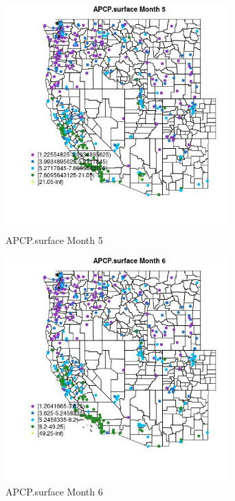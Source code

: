 \begin{figure} 
\centering  
\includegraphics[width=0.77\textwidth]{Code_Outputs/ML_input_report_ML_input_PM25_Step5_part_d_de_duplicated_aves_ML_input_MapObsMo5APCPsurface.jpg} 
\caption{\label{fig:ML_input_report_ML_input_PM25_Step5_part_d_de_duplicated_aves_ML_inputMapObsMo5APCPsurface}APCP.surface Month 5} 
\end{figure} 
 

\begin{figure} 
\centering  
\includegraphics[width=0.77\textwidth]{Code_Outputs/ML_input_report_ML_input_PM25_Step5_part_d_de_duplicated_aves_ML_input_MapObsMo6APCPsurface.jpg} 
\caption{\label{fig:ML_input_report_ML_input_PM25_Step5_part_d_de_duplicated_aves_ML_inputMapObsMo6APCPsurface}APCP.surface Month 6} 
\end{figure} 
 

